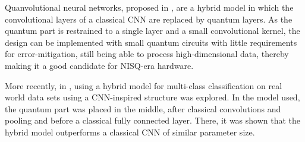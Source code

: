 Quanvolutional neural networks, proposed in \cite{henderson2020}, are a hybrid model in which the convolutional layers of a classical CNN are replaced by quantum layers.
As the quantum part is restrained to a single layer and a small convolutional kernel, the design can be implemented with small quantum circuits with little requirements for error-mitigation, still being able to process high-dimensional data, thereby making it a good candidate for NISQ-era hardware.

More recently, in \cite{zeng2022}, using a hybrid model for multi-class classification on real world data sets using a CNN-inspired structure was explored.
In the model used, the quantum part was placed in the middle, after classical convolutions and pooling and before a classical fully connected layer.
There, it was shown that the hybrid model outperforms a classical CNN of similar parameter size.